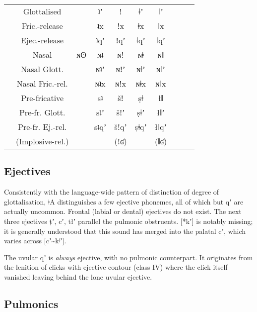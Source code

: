 \documentclass[11pt,a5paper]{book}
\newcommand{\qcn}[1]{\textcolor{AccentText}{\large#1}}
\newcommand{\langname}{\qcn{ǂA}}
\newcommand{\voidcell}{\cellcolor[gray]{.9}}
\begin{document}
\begin{center}
\begin{tabular}{cc|cccccccc}
 & Glottalised & \voidcell & \qcn{ʇʼ} &\qcn{ǃ} & \qcn{ǂʼ} & \qcn{ǁʼ}  \\ \cline{2-7}
 & Fric.-release & \voidcell  & \qcn{ʇx} &\qcn{ǃx} &\qcn{ǂx} & \qcn{ǁx}  \\ \cline{2-7}
 & Ejec.-release & \voidcell & \qcn{ʇqʼ} &\qcn{ǃqʼ} &\qcn{ǂqʼ} & \qcn{ǁqʼ}  \\ \cline{2-7}
 & Nasal &  \qcn{ɴʘ}   & \qcn{ɴʇ} &\qcn{ɴǃ} &\qcn{ɴǂ} & \qcn{ɴǁ}  \\ \cline{2-7}
 & Nasal Glott. &  \voidcell   & \qcn{ɴʇʼ} &\qcn{ɴǃʼ} &\qcn{ɴǂʼ} & \qcn{ɴǁʼ}  \\ \cline{2-7}
 & Nasal Fric.-rel. & \voidcell    & \qcn{ɴʇx} &\qcn{ɴǃx} &\qcn{ɴǂx} & \qcn{ɴǁx}  \\ \cline{2-7}
 & Pre-fricative & \voidcell    & \qcn{sʇ} &\qcn{šǃ} &\qcn{ṣǂ} & \qcn{łǁ}  \\ \cline{2-7}
 & Pre-fr. Glott. &   \voidcell  & \qcn{sʇʼ} &\qcn{šǃʼ} &\qcn{ṣǂʼ} & \qcn{łǁʼ}  \\ \cline{2-7}
 & Pre-fr. Ej.-rel. &   \voidcell  & \qcn{sʇqʼ} &\qcn{šǃqʼ} &\qcn{ṣǂqʼ} & \qcn{łǁqʼ}  \\ \cline{2-7}
& (Implosive-rel.) & \voidcell & \voidcell & (\qcn{ǃʛ}) & \voidcell & (\qcn{ǁʛ})  \\ \cline{1-7}
\end{tabular}
\end{center}


\subsection{Ejectives}

Consistently with the language-wide pattern of distinction of degree of glottalisation, \langname{} distinguishes a few ejective phonemes, all of which but \qcn{qʼ} are actually uncommon. Frontal (labial or dental) ejectives do not exist. The next three ejectives \qcn{ṭʼ, cʼ, tłʼ} parallel the pulmonic obstruents. [*kʼ] is notably missing; it is generally understood that this sound has merged into the palatal \qcn{cʼ}, which varies across [cʼ\textasciitilde{}kʲʼ]. 

The uvular \qcn{qʼ} is \emph{always} ejective, with no pulmonic counterpart. It originates from the lenition of clicks with ejective contour (class IV) where the click itself vanished leaving behind the lone uvular ejective.

\subsection{Pulmonics}	
\end{document}

